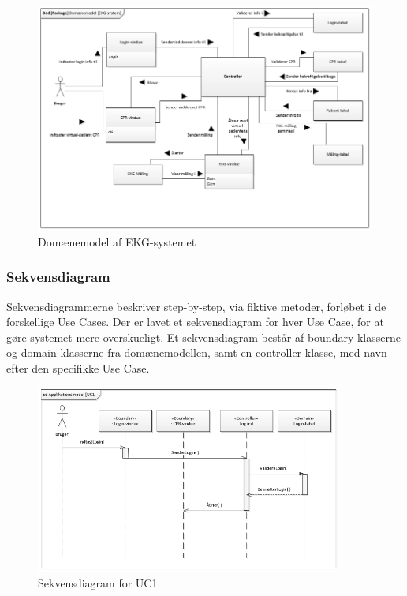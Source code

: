 \begin{figure}[H]
	\centering
	\includegraphics[width=1\textwidth]{Figurer/Snip20150429_37}
	\caption{Domænemodel af EKG-systemet}
\end{figure}

\subsubsection{Sekvensdiagram}
Sekvensdiagrammerne beskriver step-by-step, via fiktive metoder, forløbet i de forskellige Use Cases. Der er lavet et sekvensdiagram for hver Use Case, for at gøre systemet mere overskueligt. Et sekvensdiagram består af boundary-klasserne og domain-klasserne fra domænemodellen, samt en controller-klasse, med navn efter den specifikke Use Case.  

\begin{figure}[H]
	\centering
	\includegraphics[width=0.9\textwidth]{Figurer/Snip20150429_34}
	\caption{Sekvensdiagram for UC1}
\end{figure}

